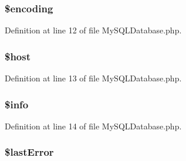 \subsubsection[{\$encoding}]{\setlength{\rightskip}{0pt plus 5cm}\$encoding\hspace{0.3cm}{\ttfamily [protected]}}\label{class_my_s_q_l_database_aee271b7ce67fbe00b9976e6c347cbfbf}


Definition at line 12 of file My\+S\+Q\+L\+Database.\+php.

\hypertarget{class_my_s_q_l_database_a711797613cb863ca0756df789c396bf2}{}
\subsubsection[{\$host}]{\setlength{\rightskip}{0pt plus 5cm}\$host\hspace{0.3cm}{\ttfamily [protected]}}\label{class_my_s_q_l_database_a711797613cb863ca0756df789c396bf2}


Definition at line 13 of file My\+S\+Q\+L\+Database.\+php.

\hypertarget{class_my_s_q_l_database_ae19722790c6683980bbf0af8572f26ab}{}
\subsubsection[{\$info}]{\setlength{\rightskip}{0pt plus 5cm}\$info\hspace{0.3cm}{\ttfamily [protected]}}\label{class_my_s_q_l_database_ae19722790c6683980bbf0af8572f26ab}


Definition at line 14 of file My\+S\+Q\+L\+Database.\+php.

\hypertarget{class_my_s_q_l_database_a6cb6be70a528323568af007db6a3885e}{}
\subsubsection[{\$last\+Error}]{\setlength{\rightskip}{0pt plus 5cm}\$last\+Error\hspace{0.3cm}{\ttfamily [protected]}}\label{class_my_s_q_l_database_a6cb6be70a528323568af007db6a3885e}


